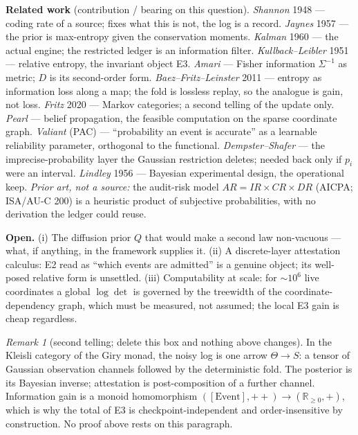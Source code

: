 \documentclass[11pt]{article}
\theoremstyle{definition}\newtheorem{definition}{Definition}
\theoremstyle{plain}\newtheorem{proposition}{Proposition}
\theoremstyle{remark}\newtheorem{remark}{Remark}
\newcommand{\acc}{p}                 %
\newcommand{\cov}{\Sigma}
\newcommand{\KL}{D}                  %
\begin{document}
\smallskip\noindent\textbf{Related work} (contribution / bearing on this question).
{\small \emph{Shannon} 1948 --- coding rate of a source; fixes what this is not, the log is a record.
\emph{Jaynes} 1957 --- the prior is max-entropy given the conservation moments.
\emph{Kalman} 1960 --- the actual engine; the restricted ledger is an information filter.
\emph{Kullback--Leibler} 1951 --- relative entropy, the invariant object E3.
\emph{Amari} --- Fisher information $\cov^{-1}$ as metric; $\KL$ is its second-order form.
\emph{Baez--Fritz--Leinster} 2011 --- entropy as information loss along a map; the fold is lossless replay, so the analogue is gain, not loss.
\emph{Fritz} 2020 --- Markov categories; a second telling of the update only.
\emph{Pearl} --- belief propagation, the feasible computation on the sparse coordinate graph.
\emph{Valiant} (PAC) --- ``probability an event is accurate'' as a learnable reliability parameter, orthogonal to the functional.
\emph{Dempster--Shafer} --- the imprecise-probability layer the Gaussian restriction deletes; needed back only if $\acc_i$ were an interval.
\emph{Lindley} 1956 --- Bayesian experimental design, the operational keep.
\emph{Prior art, not a source:} the audit-risk model $AR=IR\times CR\times DR$ (AICPA; ISA/AU-C 200) is a heuristic product of subjective probabilities, with no derivation the ledger could reuse.}

\smallskip\noindent\textbf{Open.} (i) The diffusion prior $Q$ that would make a second law
non-vacuous --- what, if anything, in the framework supplies it. (ii) A discrete-layer attestation
calculus: E2 read as ``which events are admitted'' is a genuine object; its well-posed relative
form is unsettled. (iii) Computability at scale: for $\sim10^{6}$ live coordinates a global
$\log\det$ is governed by the treewidth of the coordinate-dependency graph, which must be
measured, not assumed; the local E3 gain is cheap regardless.

\begin{remark}[second telling; delete this box and nothing above changes]
In the Kleisli category of the Giry monad, the noisy log is one arrow $\Theta\to S$: a tensor of
Gaussian observation channels followed by the deterministic fold. The posterior is its Bayesian
inverse; attestation is post-composition of a further channel. Information gain is a monoid
homomorphism $([\text{Event}],{+}{+})\to(\mathbb{R}_{\ge0},+)$, which is why the total of E3 is
checkpoint-independent and order-insensitive by construction. No proof above rests on this
paragraph.
\end{remark}
\end{document}
